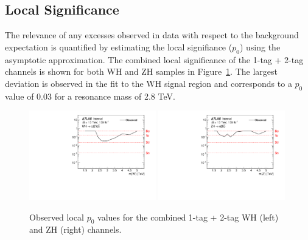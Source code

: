 \subsection{Local Significance}

The relevance of any excesses observed in data with respect to the background expectation is quantified by estimating the local signifiance ($p_0$) using the asymptotic approximation.
The combined local significance of the 1-tag + 2-tag channels is shown for both WH and ZH samples in Figure~\ref{fig:local_p0_combined}.
The largest deviation is observed in the fit to the WH signal region and corresponds to a $p_0$ value of 0.03 for a resonance mass of 2.8 TeV.

\begin{figure}[htbp!]
    \begin{center}
        \includegraphics[width=0.49\textwidth]{VHqqbbLocalP0_WH.pdf}
        \includegraphics[width=0.49\textwidth]{VHqqbbLocalP0_ZH.pdf}
    \end{center}
    \caption{Observed local $p_0$ values for the combined 1-tag + 2-tag WH (left) and ZH (right) channels.}
    \label{fig:local_p0_combined}
\end{figure}

